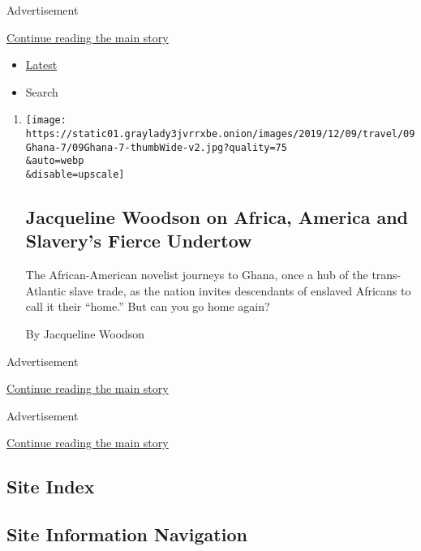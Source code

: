 Advertisement

\protect\hyperlink{after-mid1}{Continue reading the main story}

\begin{itemize}
\tightlist
\item
  \protect\hyperlink{stream-panel}{Latest}
\item
  Search
\end{itemize}

\begin{enumerate}
\def\labelenumi{\arabic{enumi}.}
\item
  \href{/2019/12/09/travel/ghana-african-slave-trade-jacqueline-woodson.html}{}

  \texttt{[image: https://static01.graylady3jvrrxbe.onion/images/2019/12/09/travel/09Ghana-7/09Ghana-7-thumbWide-v2.jpg?quality=75\\\&auto=webp\\\&disable=upscale]}

  \hypertarget{jacqueline-woodson-on-africa-america-and-slaverys-fierce-undertow}{%
  \subsection{Jacqueline Woodson on Africa, America and Slavery's Fierce
  Undertow}\label{jacqueline-woodson-on-africa-america-and-slaverys-fierce-undertow}}

  The African-American novelist journeys to Ghana, once a hub of the
  trans-Atlantic slave trade, as the nation invites descendants of
  enslaved Africans to call it their ``home.'' But can you go home
  again?

  By Jacqueline Woodson
\end{enumerate}

Advertisement

\protect\hyperlink{after-mid2}{Continue reading the main story}

Advertisement

\protect\hyperlink{after-mktg}{Continue reading the main story}

\hypertarget{site-index}{%
\subsection{Site Index}\label{site-index}}

\hypertarget{site-information-navigation}{%
\subsection{Site Information
Navigation}\label{site-information-navigation}}

